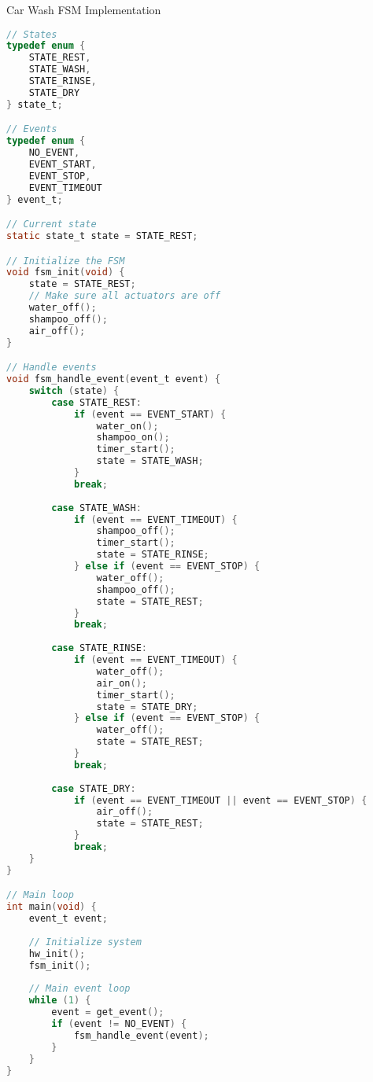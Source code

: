 \begin{code}{Car Wash FSM Implementation}
\begin{lstlisting}[language=C, style=basesmol]
// States
typedef enum {
    STATE_REST,
    STATE_WASH,
    STATE_RINSE,
    STATE_DRY
} state_t;

// Events
typedef enum {
    NO_EVENT,
    EVENT_START,
    EVENT_STOP,
    EVENT_TIMEOUT
} event_t;

// Current state
static state_t state = STATE_REST;

// Initialize the FSM
void fsm_init(void) {
    state = STATE_REST;
    // Make sure all actuators are off
    water_off();
    shampoo_off();
    air_off();
}

// Handle events
void fsm_handle_event(event_t event) {
    switch (state) {
        case STATE_REST:
            if (event == EVENT_START) {
                water_on();
                shampoo_on();
                timer_start();
                state = STATE_WASH;
            }
            break;
            
        case STATE_WASH:
            if (event == EVENT_TIMEOUT) {
                shampoo_off();
                timer_start();
                state = STATE_RINSE;
            } else if (event == EVENT_STOP) {
                water_off();
                shampoo_off();
                state = STATE_REST;
            }
            break;
            
        case STATE_RINSE:
            if (event == EVENT_TIMEOUT) {
                water_off();
                air_on();
                timer_start();
                state = STATE_DRY;
            } else if (event == EVENT_STOP) {
                water_off();
                state = STATE_REST;
            }
            break;
            
        case STATE_DRY:
            if (event == EVENT_TIMEOUT || event == EVENT_STOP) {
                air_off();
                state = STATE_REST;
            }
            break;
    }
}

// Main loop
int main(void) {
    event_t event;
    
    // Initialize system
    hw_init();
    fsm_init();
    
    // Main event loop
    while (1) {
        event = get_event();
        if (event != NO_EVENT) {
            fsm_handle_event(event);
        }
    }
}
\end{lstlisting}
\end{code}

